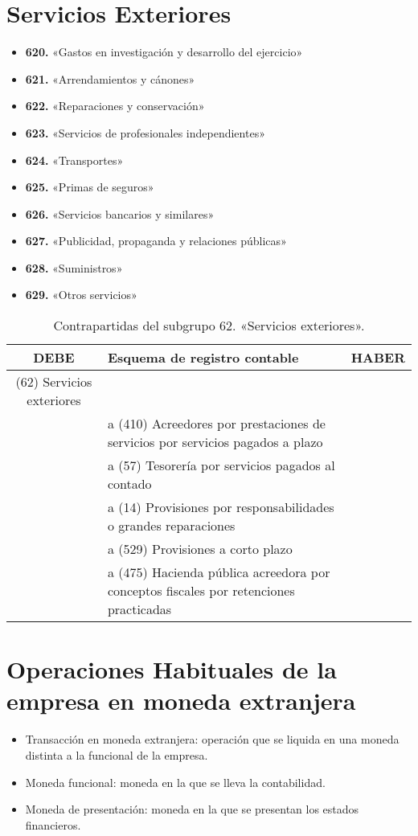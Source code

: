 \documentclass[a4paper,12pt]{article}
\begin{document}
\section{Servicios Exteriores}
\begin{itemize}
    \item \textbf{620.} «Gastos en investigación y desarrollo del ejercicio»
    \item \textbf{621.} «Arrendamientos y cánones»
    \item \textbf{622.} «Reparaciones y conservación»
    \item \textbf{623.} «Servicios de profesionales independientes»
    \item \textbf{624.} «Transportes»
    \item \textbf{625.} «Primas de seguros»
    \item \textbf{626.} «Servicios bancarios y similares»
    \item \textbf{627.} «Publicidad, propaganda y relaciones públicas»
    \item \textbf{628.} «Suministros»
    \item \textbf{629.} «Otros servicios»
\end{itemize}

\begin{table}[H]
    \centering
    \begin{tabular}{|c|p{7cm}|c|}
    \hline
    \textbf{DEBE} & \textbf{Esquema de registro contable} & \textbf{HABER} \\ \hline
    (62) Servicios exteriores &  &  \\ \hline
    & a (410) Acreedores por prestaciones de servicios por servicios pagados a plazo &  \\ \hline
    & a (57) Tesorería por servicios pagados al contado &  \\ \hline
    & a (14) Provisiones por responsabilidades o grandes reparaciones &  \\ \hline
    & a (529) Provisiones a corto plazo &  \\ \hline
    & a (475) Hacienda pública acreedora por conceptos fiscales por retenciones practicadas &  \\ \hline
    \end{tabular}
    \caption{Contrapartidas del subgrupo 62. «Servicios exteriores».}
\end{table}
    
    
\section{Operaciones Habituales de la empresa en moneda extranjera}
\begin{itemize}
    \item Transacción en moneda extranjera: operación que se liquida en una moneda distinta a la funcional de la empresa.
    \item Moneda funcional: moneda en la que se lleva la contabilidad.
    \item Moneda de presentación: moneda en la que se presentan los estados financieros.
\end{itemize}
\end{document}
